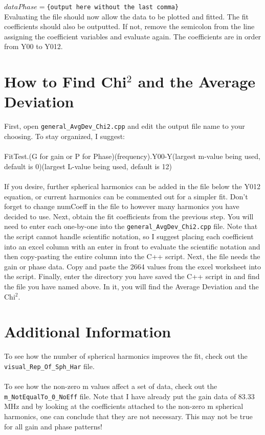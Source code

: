 \documentclass[11pt]{article} %
\begin{document}
\texttt{$dataPhase = $\{output here without the last comma\}}\\

Evaluating the file should now allow the data to be plotted and fitted. The fit coefficients should also be outputted. If not, remove the semicolon from the line assigning the coefficient variables and evaluate again. The coefficients are in order from Y00 to Y012.


\section{How to Find Chi$^2$ and the Average Deviation}

First, open \texttt{general\_AvgDev\_Chi2.cpp} and edit the output file name to your choosing. To stay organized, I suggest:\\ \\
 FitTest.(G for gain or P for Phase)(frequency).Y00-Y(largest m-value being used, default is 0)(largest L-value being used, default is 12) \\ \\
If you desire, further spherical harmonics can be added in the file below the Y012 equation, or current harmonics can be commented out for a simpler fit. Don't forget to change numCoeff in the file to however many harmonics you have decided to use.
Next, obtain the fit coefficients from the previous step. You will need to enter each one-by-one into the \texttt{general\_AvgDev\_Chi2.cpp} file. Note that the script cannot handle scientific notation, so I suggest placing each coefficient into an excel column with an enter in front to evaluate the scientific notation and then copy-pasting the entire column into the C++ script. Next, the file needs the gain or phase data. Copy and paste the 2664 values from the excel worksheet into the script. Finally, enter the directory you have saved the C++ script in and find the file you have named above. In it, you will find the Average Deviation and the Chi$^2$.


\section{Additional Information}

To see how the number of spherical harmonics improves the fit, check out the \texttt{visual\_Rep\_Of\_Sph\_Har} file.\\ \\
To see how the non-zero m values affect a set of data, check out the \texttt{m\_NotEqualTo\_0\_NoEff} file. Note that I have already put the gain data of 83.33 MHz and by looking at the coefficients attached to the non-zero m spherical harmonics, one can conclude that they are not necessary. This may not be true for all gain and phase patterns!
\end{document}
